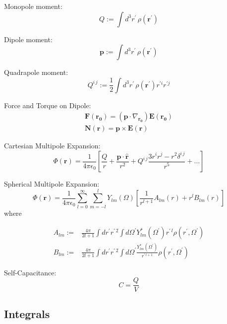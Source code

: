 \documentclass[a4paper, twocolumn]{article}
\renewcommand{\vec}[1]{\boldsymbol{#1}}
\begin{document}
Monopole moment:
\begin{equation*}
    Q := \int d^{3}r^{\prime} \, \rho(\vec{r}^{\prime})
\end{equation*}

Dipole moment:
\begin{equation*}
    \vec{p} := \int d^{3}r^{\prime} \, \rho(\vec{r}^{\prime})
\end{equation*}

Quadrapole moment:
\begin{equation*}
    Q^{i \, j} := \frac{1}{2} \int d^{3} r^{\prime} \, \rho(\vec{r}^{\prime}) r^{\prime i} r^{\prime j}
\end{equation*}

Force and Torque on Dipole:
\begin{align*}
    \vec{F}(\vec{r_{0}}) = (\vec{p} \cdot \nabla_{\vec{r_{0}}}) \vec{E}(\vec{r_{0}}) \\
    \vec{N}(\vec{r}) = \vec{p} \times \vec{E}(\vec{r})
\end{align*}

Cartesian Multipole Expansion:
\begin{equation*}
    \Phi(\vec{r}) = \frac{1}{4 \pi \epsilon_{0}} \left[ \frac{Q}{r} + \frac{\vec{p} \cdot \hat{\vec{r}}}{r^{2}} + Q^{i \, j} \frac{3r^{i}r^{j} - r^{2}\delta^{i\,j}}{r^5} + \dots \right]
\end{equation*}

Spherical Multipole Expansion:
\begin{equation*}
    \Phi(\vec{r}) = \frac{1}{4 \pi \epsilon_{0}} \sum\limits_{l=0}^{\infty} \sum\limits_{m=-l}^{l} Y_{lm}(\Omega) \left[ \frac{1}{r^{l+1}} A_{lm}(r) + r^{l} B_{lm}(r) \right]
\end{equation*}
where

\begin{align*}
    A_{lm} :=& \frac{4 \pi}{2l + 1} \int d r^{\prime} r^{\prime \, 2} \int d \Omega^{\prime} Y_{lm}^{*}(\Omega^{\prime}) r^{\prime \, l} \rho(r^{\prime}, \Omega^{\prime}) \\
    B_{lm} :=& \frac{4 \pi}{2l + 1} \int d r^{\prime} r^{\prime \, 2} \int d \Omega^{\prime}  \frac{Y_{lm}^{*}(\Omega^{\prime})}{r^{\prime \, l+1}} \rho(r^{\prime}, \Omega^{\prime})
\end{align*}

Self-Capacitance:
\begin{equation*}
    C = \frac{Q}{V}
\end{equation*}

\subsection{Integrals}
\end{document}
